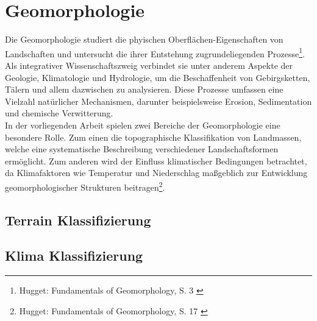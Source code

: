 
\section{Geomorphologie}

Die Geomorphologie studiert die phyischen Oberflächen-Eigenschaften von Landschaften und untersucht die ihrer Entstehung zugrundeliegenden Prozesse\footnote{
    Hugget: Fundamentals of Geomorphology, S. 3
    \cite{huggett2022fundamentals}
}. Als integrativer Wissenschaftszweig verbindet sie unter anderem Aspekte der Geologie, Klimatologie und Hydrologie, um die Beschaffenheit von Gebirgsketten, Tälern und allem dazwischen zu analysieren. Diese Prozesse umfassen eine Vielzahl natürlicher Mechanismen, darunter beispielsweise Erosion, Sedimentation und chemische Verwitterung. \\
In der vorliegenden Arbeit spielen zwei Bereiche der Geomorphologie eine besondere Rolle. Zum einen die topographische Klassifikation von Landmassen, welche eine systematische Beschreibung verschiedener Landschaftsformen ermöglicht. Zum anderen wird der Einfluss klimatischer Bedingungen betrachtet, da Klimafaktoren wie Temperatur und Niederschlag maßgeblich zur Entwicklung geomorphologischer Strukturen beitragen\footnote{
    Hugget: Fundamentals of Geomorphology, S. 17
    \cite{huggett2022fundamentals}
}.


\subsection{Terrain Klassifizierung}

\subsection{Klima Klassifizierung}

